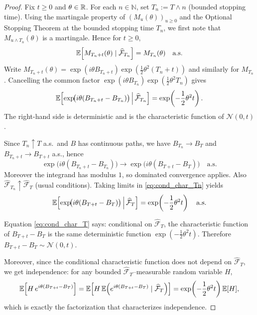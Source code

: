 \begin{proof}

Fix $t\ge0$ and $\theta\in\mathbb{R}$. For each $n\in\mathbb N$, set $T_n:=T\wedge n$ (bounded stopping time).
Using the martingale property of $(M_u(\theta))_{u\ge0}$ and the Optional Stopping Theorem at the bounded
stopping time $T_n$, we first note that $M_{u\wedge T_n}(\theta)$ is a martingale.
Hence for $t\ge0$,
\[
\mathbb{E}\!\left[M_{T_n+t}(\theta)\mid \widehat{\mathcal F}_{T_n}\right]=M_{T_n}(\theta)
\quad\text{a.s.}
\]
Write $M_{T_n+t}(\theta)=\exp(i\theta B_{T_n+t})\exp(\tfrac12\theta^2(T_n+t))$ and similarly for $M_{T_n}$.
Cancelling the common factor $\exp(i\theta B_{T_n})\exp(\tfrac12\theta^2 T_n)$ gives
\begin{equation}\label{eq:cond_char_Tn}
\mathbb{E}\!\left[\exp\!\bigl(i\theta(B_{T_n+t}-B_{T_n})\bigr)\,\Big|\,\widehat{\mathcal F}_{T_n}\right]
=\exp\!\left(-\frac12\theta^2 t\right).
\end{equation}
The right-hand side is deterministic and is the characteristic function of $\mathcal N(0,t)$.

\medskip
{}

Since $T_n\uparrow T$ a.s.\ and $B$ has continuous paths, we have
$B_{T_n}\to B_T$ and $B_{T_n+t}\to B_{T+t}$ a.s., hence
\[
\exp\!\bigl(i\theta(B_{T_n+t}-B_{T_n})\bigr)\to \exp\!\bigl(i\theta(B_{T+t}-B_T)\bigr)
\quad\text{a.s.}
\]
Moreover the integrand has modulus $1$, so dominated convergence applies.
Also $\widehat{\mathcal F}_{T_n}\uparrow \widehat{\mathcal F}_T$ (usual conditions).
Taking limits in \eqref{eq:cond_char_Tn} yields
\begin{equation}\label{eq:cond_char_T}
\mathbb{E}\!\left[\exp\!\bigl(i\theta(B_{T+t}-B_T)\bigr)\,\Big|\,\widehat{\mathcal F}_T\right]
=\exp\!\left(-\frac12\theta^2 t\right)\quad\text{a.s.}
\end{equation}

\medskip
{}

Equation \eqref{eq:cond_char_T} says: conditional on $\widehat{\mathcal F}_T$, the characteristic function of
$B_{T+t}-B_T$ is the same deterministic function $\exp(-\tfrac12\theta^2 t)$.
Therefore $B_{T+t}-B_T\sim \mathcal N(0,t)$.

Moreover, since the conditional characteristic function does not depend on $\widehat{\mathcal F}_T$,
we get independence: for any bounded $\widehat{\mathcal F}_T$--measurable random variable $H$,
\[
\mathbb{E}\!\left[H\,e^{i\theta(B_{T+t}-B_T)}\right]
=\mathbb{E}\!\left[H\,\mathbb{E}\!\left(e^{i\theta(B_{T+t}-B_T)}\mid \widehat{\mathcal F}_T\right)\right]
=\exp\!\left(-\frac12\theta^2 t\right)\mathbb{E}[H],
\]
which is exactly the factorization that characterizes independence.


\end{proof}
